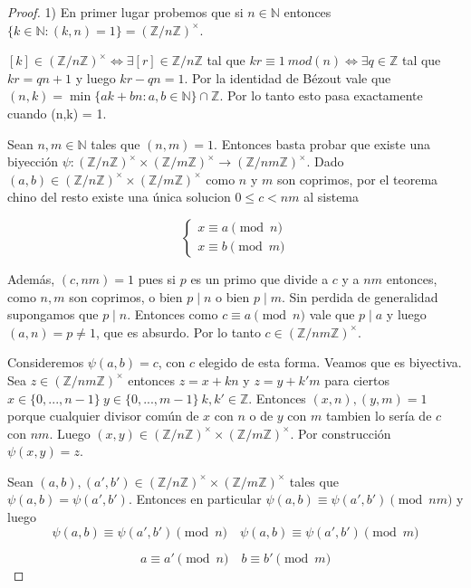 \documentclass[12pt, a4paper]{article}
\newcommand{\naturales}{\mathbb{N}}
\newcommand{\enteros}{\mathbb{Z}}
\theoremstyle{plain}
\theoremstyle{definition}
\theoremstyle{remark}
\begin{document}
\begin{proof}
1) En primer lugar probemos que si $n \in \naturales$ entonces $\{k\in \naturales : (k,n) = 1\} =
(\enteros / n\enteros)^\times$. 

$[k]\in (\enteros / n\enteros)^\times \iff \exists [r]\in \enteros / n \enteros $ tal que $ kr \equiv 1 \ mod(n) 
\iff \exists q\in \enteros $ tal que $ kr = qn + 1 $ y luego  $kr - qn = 1 $. Por la identidad de Bézout vale que
 $(n,k) = \min{\{ak + bn : a,b \in \naturales \}} \cap \enteros$. Por lo tanto esto pasa exactamente cuando (n,k) = 1.

 Sean $n,m\in \naturales$ tales que $(n,m) = 1$. 
 Entonces basta probar que existe una biyección $\psi : (\enteros / n \enteros)^\times \times (\enteros / m \enteros)^\times 
  \to(\enteros / nm \enteros)^\times $.
Dado $(a,b) \in (\enteros / n \enteros)^\times \times  (\enteros / m \enteros)^\times$ como $n$ y $m$ son coprimos,
por el teorema chino del resto existe una única solucion $ 0 \leq c < nm $ al sistema

\[
\begin{cases}
x \equiv a \pmod{n} \\
x \equiv b \pmod{m}
\end{cases}
\]

Además, $(c,nm) = 1$ pues si $p$ es un primo que divide a $c$ y a $nm$ entonces, como $n,m$ son coprimos,
 o bien $p \mid n$ o bien $p \mid m$. Sin perdida de generalidad supongamos que $p \mid n$. Entonces como 
 $c \equiv a \pmod{n}$ vale que $p \mid a$ y luego $(a,n) = p \neq 1$, que es absurdo. Por lo tanto 
 $c \in (\enteros / nm \enteros)^\times$.
 
Consideremos $\psi(a,b) = c$, con $c$ elegido de esta forma. 
Veamos que es biyectiva. Sea $z \in (\enteros / nm \enteros)^\times$ entonces 
$z = x + kn$ y $z = y + k'm$ para ciertos $x \in \{0,...,n-1\} \ y \in \{0,...,m-1\} \ k,k' \in \enteros$. 
Entonces $(x,n), (y,m) = 1$ porque cualquier divisor común de $x$ con $n$ o de $y$ con $m$ tambien lo sería de $c$ con $nm$.
Luego $(x,y) \in (\enteros / n \enteros)^\times \times (\enteros / m \enteros)^\times$.
Por construcción $\psi(x,y) = z$.

Sean $(a,b),(a',b') \in (\enteros / n \enteros)^\times \times (\enteros / m \enteros)^\times$
tales que $\psi(a,b) = \psi(a',b')$. Entonces en particular $\psi(a,b) \equiv \psi(a',b') \pmod{nm}$ y luego 
\[
\psi(a,b) \equiv \psi(a',b') \pmod{n} \quad \psi(a,b) \equiv \psi(a',b') \pmod{m}
\]

\[
a \equiv a' \pmod{n} \quad b \equiv b' \pmod{m}
\]


\end{proof}
\end{document}
